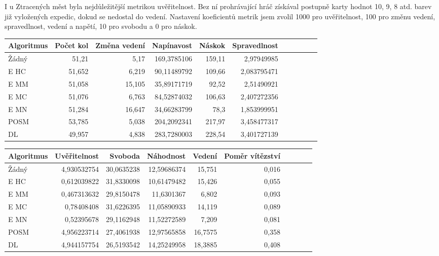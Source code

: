 I u Ztracených měst byla nejdůležitější metrikou uvěřitelnost. Bez ní prohrávající hráč získával postupně karty hodnot 10, 9, 8 atd. barev již vyložených expedic, dokud se nedostal do vedení. Nastavení koeficientů metrik jsem zvolil 1000 pro uvěřitelnost, 100 pro změnu vedení, spravedlnost, vedení a napětí, 10 pro svobodu a 0 pro náskok.

\begin{table*}[b]\footnotesize
\vspace*{0mm}
\caption{{\label{tab-lcm}} Porovnání metrik zábavnosti u jednotlivých algoritmů ve hře Ztracená města. Metriky změna vedení a svoboda se maximalizují, zbytek minimalizuje.}
\vspace*{0mm}
\label{shadowtable}
\begin{center}
\begin{tabular}{| l || r | r | r | r | r | r | r | r | r | r |}
\hline
Algoritmus & Počet kol	& Změna vedení & Napínavost & Náskok & Spravedlnost\\
\hline
\hline
Žádný & 51,21 & 5,17 & 169,3785106 & 159,11 & 2,97949985 \\ \hline  
E HC & 51,652 & 6,219 & 90,11489792 & 109,66 & 2,083795471 \\ \hline  
E MM & 51,058 & 15,105 & 35,89171719 & 92,52 & 2,51490921 \\ \hline  
E MC & 51,076 & 6,763 & 84,52874032 & 106,63 & 2,407272356 \\ \hline  
E MN & 51,284 & 16,647 & 34,66283799 & 78,3 & 1,853999951 \\ \hline  
POSM & 53,785 & 5,038 & 204,2092341 & 217,97 & 3,458477317 \\ \hline  
DL & 49,957 & 4,838 & 283,7280003 & 228,54 & 3,401727139 \\ \hline  
\end{tabular}
\end{center}
\begin{center}
\begin{tabular}{| l || r | r | r | r | r | r | r | r | r |}
\hline
Algoritmus & Uvěřitelnost & Svoboda & Náhodnost & Vedení &	Poměr vítězství \\
\hline
\hline
Žádný & 4,930532754 & 30,0635238 & 12,59686374 & 15,751 & 0,016 \\ \hline  
E HC & 0,612039822 & 31,8330098 & 10,61479482 & 15,426 & 0,055 \\ \hline  
E MM & 0,467313632 & 29,8150478 & 11,6301367 & 6,802 & 0,093 \\ \hline  
E MC & 0,78408408 & 31,6226395 & 11,05890933 & 14,119 & 0,089 \\ \hline  
E MN & 0,52395678 & 29,1162948 & 11,52272589 & 7,209 & 0,081 \\ \hline  
POSM & 4,956223714 & 27,4061938 & 12,97565858 & 16,7575 & 0,358 \\ \hline  
DL & 4,944157754 & 26,5193542 & 14,25249958 & 18,3885 & 0,408 \\ \hline  
\end{tabular}
\end{center}
\end{table*}

